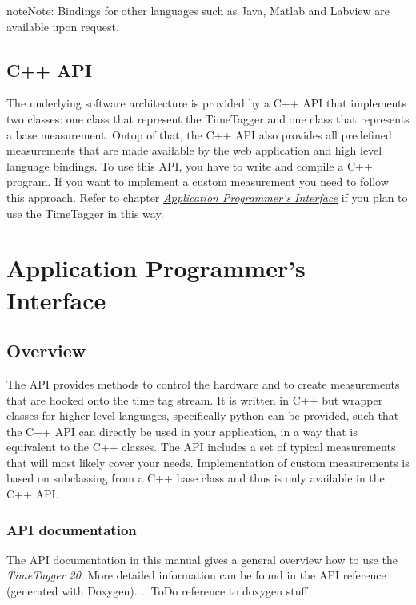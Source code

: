 \documentclass[letterpaper,10pt,english]{sphinxmanual}
\begin{document}
\begin{notice}{note}{Note:}
Bindings for other languages such as Java, Matlab and Labview are available upon request.
\end{notice}


\section{C++ API}
\label{sections/software:c-api}
The underlying software architecture is provided by a C++ API that implements
two classes: one class that represent the TimeTagger and one class that
represents a base measurement. Ontop of that, the C++ API also provides
all predefined measurements that are made available by the web
application and high level language bindings. To use this API, you have to
write and compile a C++ program. If you want to implement a custom
measurement you need to follow this approach. Refer to
chapter {\hyperref[sections/api:api]{\emph{Application Programmer's Interface}}} if you plan to use the TimeTagger in this way.


\chapter{Application Programmer's Interface}
\label{sections/api:application-programmer-s-interface}\label{sections/api:api}\label{sections/api::doc}

\section{Overview}
\label{sections/api:overview}
The API provides methods to control the hardware and to create
measurements that are hooked onto the time tag stream. It is written in C++ but
wrapper classes for higher level languages, specifically python
can be provided, such that the C++ API can directly be used in your application,
in a way that is equivalent to the C++ classes.
The API includes a set of typical measurements that will most likely
cover your needs. Implementation of custom measurements is based on
subclassing from a C++ base class and thus is only available in the C++ API.


\subsection{API documentation}
\label{sections/api:api-documentation}
The API documentation in this manual gives a general overview how to use the \emph{TimeTagger 20}.
More detailed information can be found in the API reference (generated with
Doxygen).
.. ToDo reference to doxygen stuff
\end{document}
